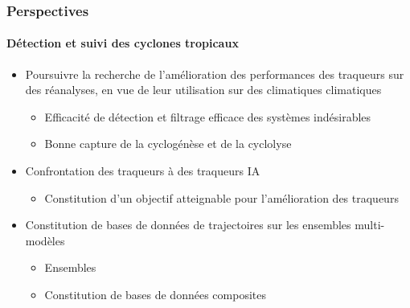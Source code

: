 \documentclass[aspectratio=169, usepdftitle=false, xcolor={dvipsnames}, 9pt,table]{beamer}
\begin{document}
\begin{frame}[c]
    \frametitle{Perspectives}
    \framesubtitle{Détection et suivi des cyclones tropicaux}
    \begin{block}
        \small
        \begin{itemize}
            \setlength{\itemsep}{2ex}
            \item<1-> Poursuivre la recherche de l'amélioration des performances des traqueurs sur des réanalyses, en vue de leur utilisation sur des climatiques
                climatiques
                \begin{itemize}
                    \item Efficacité de détection et filtrage efficace des systèmes indésirables
                    \item Bonne capture de la cyclogénèse et de la cyclolyse
                \end{itemize}
            \item<2-> Confrontation des traqueurs  à des traqueurs IA
                \begin{itemize}
                    \item Constitution d'un objectif atteignable pour l'amélioration des traqueurs
                \end{itemize}
            \item<3-> Constitution de bases de données  de trajectoires sur les ensembles multi-modèles 
                \begin{itemize}
                    \item Ensembles 
                    \item Constitution de bases de données composites
                \end{itemize}
        \end{itemize}
    \end{block}
\end{frame}
\end{document}
